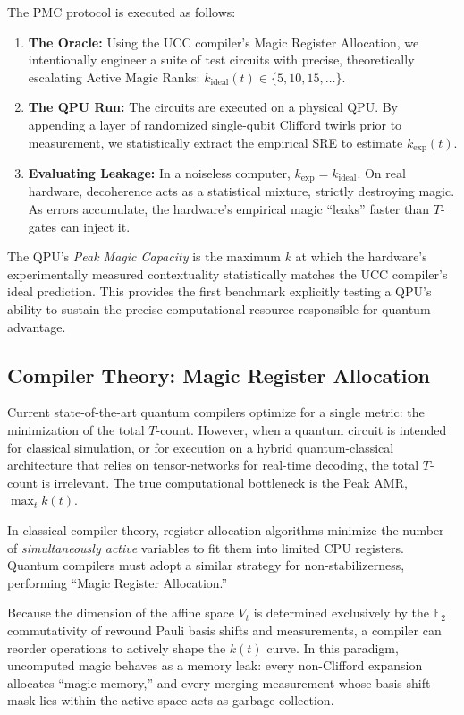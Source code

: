 \documentclass[aps,prx,reprint,superscriptaddress,nofootinbib]{revtex4-2}
\theoremstyle{definition}
\begin{document}
The PMC protocol is executed as follows:
\begin{enumerate}
    \item \textbf{The Oracle:} Using the UCC compiler's Magic Register Allocation, we intentionally engineer a suite of test circuits with precise, theoretically escalating Active Magic Ranks: $k_{\text{ideal}}(t) \in \{5, 10, 15, \dots\}$.
    \item \textbf{The QPU Run:} The circuits are executed on a physical QPU. By appending a layer of randomized single-qubit Clifford twirls prior to measurement, we statistically extract the empirical SRE to estimate $k_{\text{exp}}(t)$.
    \item \textbf{Evaluating Leakage:} In a noiseless computer, $k_{\text{exp}} = k_{\text{ideal}}$. On real hardware, decoherence acts as a statistical mixture, strictly destroying magic. As errors accumulate, the hardware's empirical magic ``leaks'' faster than $T$-gates can inject it.
\end{enumerate}

The QPU's \textit{Peak Magic Capacity} is the maximum $k$ at which the hardware's experimentally measured contextuality statistically matches the UCC compiler's ideal prediction. This provides the first benchmark explicitly testing a QPU's ability to sustain the precise computational resource responsible for quantum advantage.


\subsection{Compiler Theory: Magic Register Allocation}

Current state-of-the-art quantum compilers optimize for a single metric: the minimization of the total $T$-count. However, when a quantum circuit is intended for classical simulation, or for execution on a hybrid quantum-classical architecture that relies on tensor-networks for real-time decoding, the total $T$-count is irrelevant. The true computational bottleneck is the Peak AMR, $\max_t k(t)$.

In classical compiler theory, register allocation algorithms minimize the number of \textit{simultaneously active} variables to fit them into limited CPU registers. Quantum compilers must adopt a similar strategy for non-stabilizerness, performing ``Magic Register Allocation.''

Because the dimension of the affine space $V_t$ is determined exclusively by the $\mathbb{F}_2$ commutativity of rewound Pauli basis shifts and measurements, a compiler can reorder operations to actively shape the $k(t)$ curve. In this paradigm, uncomputed magic behaves as a memory leak: every non-Clifford expansion allocates ``magic memory,'' and every merging measurement whose basis shift mask lies within the active space acts as garbage collection.
\end{document}
